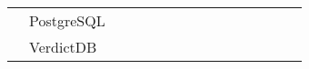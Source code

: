 \begin{table}[]
\begin{tabular}{ll|lllllllllllll}
                     & PostgreSQL &                         &                         &                         &                         &                         &                         &                         &                         &                         &                         &                         &                         &                         \\
                     & VerdictDB  &                         &                         &                         &                         &                         &                         &                         &                         &                         &                         &                         &                         &                        
\end{tabular}
\end{table}
